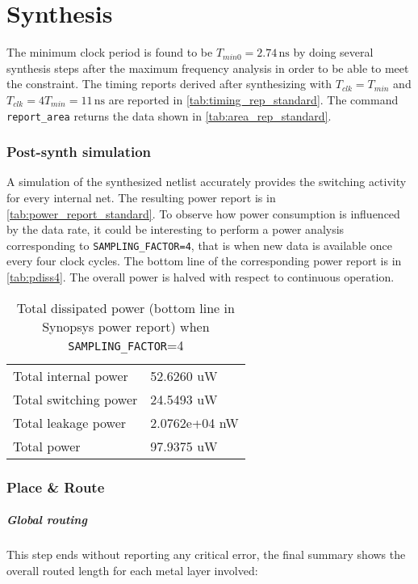 \chapter{Synthesis}
The minimum clock period is found to be $T_{min0}=2.74\,\textrm{ns}$ by doing several synthesis steps after the maximum frequency analysis in order to be able to meet the constraint. The timing reports derived after synthesizing with $T_{clk}=T_{min}$ and $T_{clk}=4T_{min}=11\,\textrm{ns}$ are reported in \autoref{tab:timing_rep_standard}.
The command \texttt{report\_area} returns the data shown in \autoref{tab:area_rep_standard}.

\subsection{Post-synth simulation}
A simulation of the synthesized netlist accurately provides the switching activity for every internal net. The resulting power report is in \autoref{tab:power_report_standard}. To observe how power consumption is influenced by the data rate, it could be interesting to perform a power analysis corresponding to \texttt{SAMPLING\_FACTOR=4}, that is when new data is available once every four clock cycles. The bottom line of the corresponding power report is in \autoref{tab:pdiss4}. The overall power is halved with respect to continuous operation.
\begin{table}
\begin{tabular}{|l|l|}
\hline
Total internal power          &   52.6260 uW  \\
Total switching power &      24.5493 uW \\
Total leakage power &    2.0762e+04 nW    \\
Total power &    97.9375 uW\\\hline
\end{tabular}
\caption{Total dissipated power (bottom line in Synopsys power report) when \texttt{SAMPLING\_FACTOR}=4}
\label{tab:pdiss4}
\end{table}

\subsection{Place \& Route}
\paragraph{Global routing} This step ends without reporting any critical error, the final summary shows the overall routed length for each metal layer involved:


